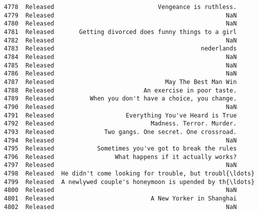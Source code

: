 \documentclass[11pt]{article}
\begin{document}
\begin{Verbatim}[commandchars=\\\{\}]
4778  Released                             Vengeance is ruthless.   
4779  Released                                                NaN   
4780  Released                                                NaN   
4781  Released       Getting divorced does funny things to a girl   
4782  Released                                                NaN   
4783  Released                                         nederlands   
4784  Released                                                NaN   
4785  Released                                                NaN   
4786  Released                                                NaN   
4787  Released                               May The Best Man Win   
4788  Released                         An exercise in poor taste.   
4789  Released          When you don't have a choice, you change.   
4790  Released                                                NaN   
4791  Released                    Everything You've Heard is True   
4792  Released                           Madness. Terror. Murder.   
4793  Released              Two gangs. One secret. One crossroad.   
4794  Released                                                NaN   
4795  Released            Sometimes you've got to break the rules   
4796  Released                 What happens if it actually works?   
4797  Released                                                NaN   
4798  Released  He didn't come looking for trouble, but troubl{\ldots}   
4799  Released  A newlywed couple's honeymoon is upended by th{\ldots}   
4800  Released                                                NaN   
4801  Released                           A New Yorker in Shanghai   
4802  Released                                                NaN   


\end{Verbatim}
\end{document}
